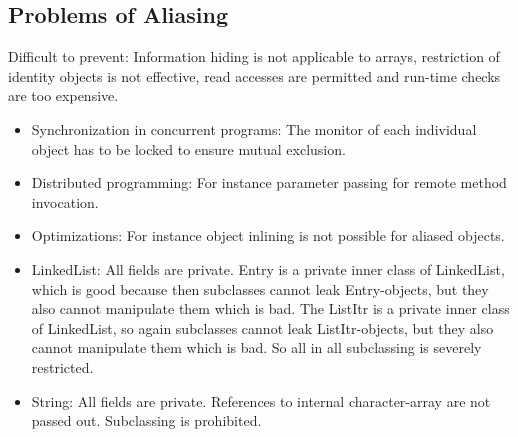 \subsection{Problems of Aliasing}
\begin{mytitle}[Leaking] Difficult to prevent: Information hiding is not applicable to arrays, restriction of identity objects is not effective, read accesses are permitted and run-time checks are too expensive.
\end{mytitle}
\begin{mytitle} \hfill
\begin{itemize}
    \item Synchronization in concurrent programs: The monitor of each individual object has to be locked to ensure mutual exclusion.
    \item Distributed programming: For instance parameter passing for remote method invocation.
    \item Optimizations: For instance object inlining is not possible for aliased objects.
\end{itemize}
\end{mytitle}
\begin{mytitle}\hfill
\begin{itemize}
    \item LinkedList: All fields are private. Entry is a private inner class of LinkedList, which is good because then subclasses cannot leak Entry-objects, but they also cannot manipulate them which is bad. The ListItr is a private inner class of LinkedList, so again subclasses cannot leak ListItr-objects, but they also cannot manipulate them which is bad. So all in all subclassing is severely restricted.
    \item String: All fields are private. References to internal character-array are not passed out. Subclassing is prohibited.
\end{itemize}
\end{mytitle}

